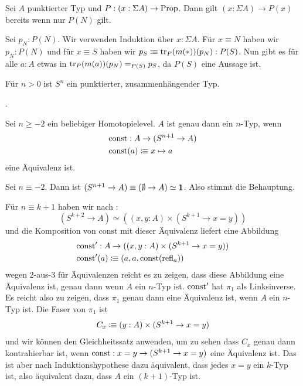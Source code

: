 \begin{lemma}
  \label{suspension-aussagenfamilie}
  Sei $A$ punktierter Typ und $P:(x:\Sigma A)\to \mathrm{Prop}$.
  Dann gilt $(x:\Sigma A)\to P(x)$ bereits wenn nur $P(N)$ gilt.
\end{lemma}

\begin{beweis}
  Sei $p_N:P(N)$. Wir verwenden Induktion über $x:\Sigma A$.
  Für $x\equiv N$ haben wir $p_N:P(N)$ und für $x\equiv S$ haben wir $p_S\vcentcolon\mspace{-1.2mu}\equiv \mathrm{tr}_P(m(\ast))(p_N):P(S)$.
  Nun gibt es für alle $a:A$ etwas in $\mathrm{tr}_P(m(a))(p_N)=_{P(S)}p_S$, da $P(S)$ eine Aussage ist.
\end{beweis}

\begin{bemerkung}
  Für $n>0$ ist $S^n$ ein punktierter, zusammenhängender Typ.
\end{bemerkung}

\begin{beweis}
  .
\end{beweis}

\begin{lemma}
  \label{n-typen-sind-Sn+1-null}
  Sei $n\geq -2$ ein beliebiger Homotopielevel.
  $A$ ist genau dann ein $n$-Typ, wenn
  \begin{align*}
    &\mathrm{const}:A\to (S^{n+1}\to A) \\
    &\mathrm{const}(a)\vcentcolon\mspace{-1.2mu}\equiv x\mapsto a
  \end{align*}
  eine Äquivalenz ist.
\end{lemma}

\begin{beweis}
  Sei $n\equiv -2$. Dann ist $(S^{n+1}\to A )\equiv (\emptyset\to A )\simeq \mathbf{1}$.
  Also stimmt die Behauptung.

  Für $n\equiv k+1$ haben wir nach :
  \[ (S^{k+2}\to A) \simeq ((x,y:A)\times (S^{k+1}\to x=y))\]
  und die Komposition von $\mathrm{const}$ mit dieser Äquivalenz liefert eine Abbildung
  \begin{align*}
    &\mathrm{const}^\prime : A\to ((x,y:A)\times (S^{k+1}\to x=y)) \\
    &\mathrm{const}^\prime(a)\vcentcolon\mspace{-1.2mu}\equiv (a,a,\mathrm{const}(\mathrm{refl}_a))
  \end{align*}
  wegen 2-aus-3 für Äquivalenzen reicht es zu zeigen, dass diese Abbildung eine Äquivalenz ist, genau dann wenn $A$ ein $n$-Typ ist.
  $\mathrm{const}^\prime$ hat $\pi_1$ als Linksinverse.
  Es reicht also zu zeigen, dass $\pi_1$ genau dann eine Äquivalenz ist, wenn $A$ ein $n$-Typ ist.
  Die Faser von $\pi_1$ ist
  \[
  C_x\vcentcolon\mspace{-1.2mu}\equiv (y:A)\times (S^{k+1}\to x=y)
  \]
  und wir können den Gleichheitssatz anwenden, um zu sehen dass $C_x$ genau dann kontrahierbar ist,
  wenn $\mathrm{const}:x=y\to (S^{k+1}\to x=y)$ eine Äquivalenz ist.
  Das ist aber nach Induktionshypothese dazu äquivalent, dass jedes $x=y$ ein $k$-Typ ist,
  also äquivalent dazu, dass $A$ ein $(k+1)$-Typ ist.
\end{beweis}

